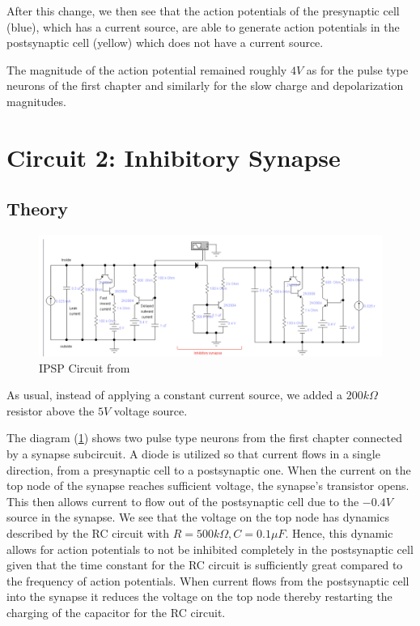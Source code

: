 \documentclass[12]{book}
\newcommand\0{\mathbf{0}}
\newcommand\<{\langle}
\renewcommand\>{\rangle}
\begin{document}
After this change, we then see that the action potentials of the presynaptic cell (blue), which has a current source, are able to generate action potentials in the postsynaptic cell (yellow) which does not have a current source.  

The magnitude of the action potential remained roughly $4V$ as for the pulse type neurons of the first chapter and similarly for the slow charge and depolarization magnitudes.

\section{Circuit 2: Inhibitory Synapse}

\subsection{Theory}

\begin{figure}[h]
\centering
\includegraphics[width=\textwidth]{inhibitory_circuit}	
\caption{IPSP Circuit from \cite{levitan2015neuron}}
\label{fig:ipsp}
\end{figure}

As usual, instead of applying a constant current source, we added a $200k\Omega$ resistor above the $5V$ voltage source.

The diagram (\ref{fig:ipsp}) shows two pulse type neurons from the first chapter connected by a synapse subcircuit. A diode is utilized so that current flows in a single direction, from a presynaptic cell to a postsynaptic one. When the current on the top node of the synapse reaches sufficient voltage, the synapse's transistor opens. This then allows current to flow out of the postsynaptic cell due to the $-0.4V$ source in the synapse. We see that the voltage on the top node has dynamics described by the RC circuit with $R=500 k \Omega, C = 0.1 \mu F$. Hence, this dynamic allows for action potentials to not be inhibited completely in the postsynaptic cell given that the time constant for the RC circuit is sufficiently great compared to the frequency of action potentials. When current flows from the postsynaptic cell into the synapse it reduces the voltage on the top node thereby restarting the charging of the capacitor for the RC circuit.
\end{document}
